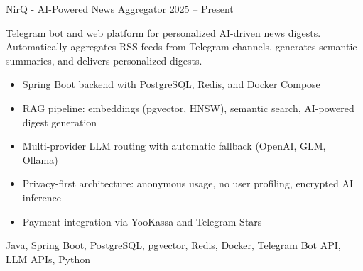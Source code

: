 \begin{projects}
	\project
        {NirQ - AI-Powered News Aggregator}
        {}
        {2025 -- Present}
        {
            Telegram bot and web platform for personalized AI-driven news digests. Automatically aggregates RSS feeds from Telegram channels, generates semantic summaries, and delivers personalized digests.

            \begin{itemize}
                \item {Spring Boot backend with PostgreSQL, Redis, and Docker Compose}
                \item {RAG pipeline: embeddings (pgvector, HNSW), semantic search, AI-powered digest generation}
                \item {Multi-provider LLM routing with automatic fallback (OpenAI, GLM, Ollama)}
                \item {Privacy-first architecture: anonymous usage, no user profiling, encrypted AI inference}
                \item {Payment integration via YooKassa and Telegram Stars}
            \end{itemize}
        }
	    { Java, Spring Boot, PostgreSQL, pgvector, Redis, Docker, Telegram Bot API, LLM APIs, Python }
\end{projects}
